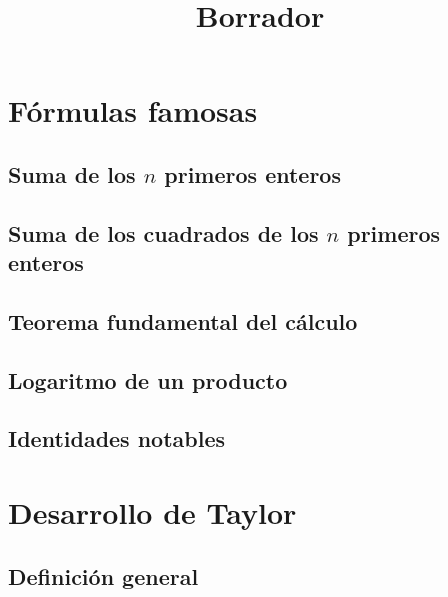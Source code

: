 \documentclass{article}
\author{}
\date{}
\title{Borrador}
\begin{document}
\maketitle


\begin{abstract}

\end{abstract}

\section{Fórmulas famosas}

\subsection{Suma de los $n$ primeros enteros}


\subsection{Suma de los cuadrados de los $n$ primeros enteros}


\subsection{Teorema fundamental del cálculo}


\subsection{Logaritmo de un producto}


\subsection{Identidades notables}


\section{Desarrollo de Taylor}

\subsection{Definición general}
\end{document}
